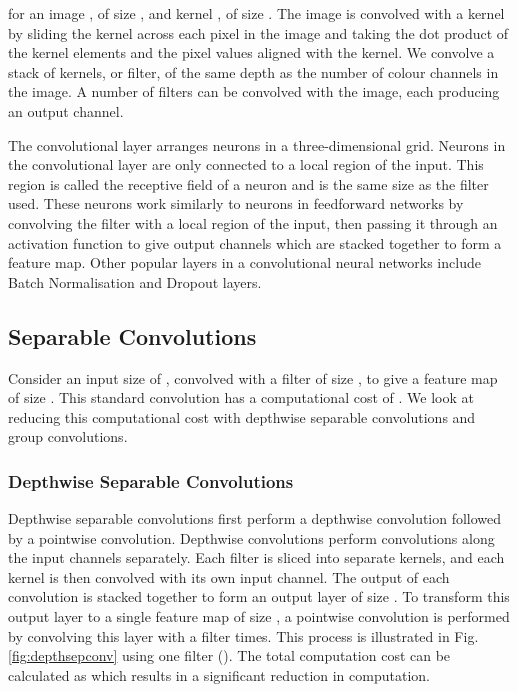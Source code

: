 \documentclass[conference]{IEEEtran}
\begin{document}
for an image , of size , and kernel , of size . The image is convolved with a kernel by sliding the kernel across each pixel in the image and taking the dot product of the kernel elements and the pixel values aligned with the kernel. We convolve a stack of kernels, or filter, of the same depth as the number of colour channels in the image. A number of filters can be convolved with the image, each producing an output channel.

The convolutional layer arranges neurons in a three-dimensional grid. Neurons in the convolutional layer are only connected to a local region of the input. This region is called the receptive field of a neuron and is the same size as the filter used. These neurons work similarly to neurons in feedforward networks by convolving the filter with a local region of the input, then passing it through an activation function to give output channels which are stacked together to form a feature map. Other popular layers in a convolutional neural networks include Batch Normalisation \cite{ioffe2015batch} and  Dropout \cite{srivastava2014dropout} layers.


\subsection{Separable Convolutions}
Consider an input size of , convolved with a filter of size , to give a feature map of size . This standard convolution has a computational cost of . We look at reducing this computational cost with depthwise separable convolutions and group convolutions.

\subsubsection{Depthwise Separable Convolutions}
Depthwise separable convolutions \cite{sifre2014rigid} first perform a depthwise convolution followed by a pointwise convolution. Depthwise convolutions perform convolutions along the input channels separately. Each filter is sliced into  separate  kernels, and each kernel is then convolved with its own input channel. The output of each convolution is stacked together to form an output layer of size . To transform this output layer to a single feature map of size , a pointwise convolution is performed by convolving this layer with a  filter  times. This process is illustrated in Fig. \ref{fig:depthsepconv} using one filter (). The total computation cost can be calculated as  which results in a significant reduction in computation.
\end{document}
